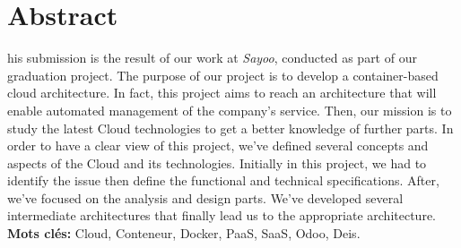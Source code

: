 
\chapter*{Abstract}
\begin{singlespace}
his submission is the result of our work at \emph{Sayoo}, conducted as part of our graduation project. The purpose of our project is to develop a container-based cloud architecture. 
\newline
\newline
In fact, this project aims to reach an architecture that will enable automated management of the company's service. Then, our mission is to study the latest Cloud technologies to get a better knowledge of further parts.
\noindent In order to have a clear view of this project, we've defined several concepts and aspects of the Cloud and its technologies.
\newline
\newline
Initially in this project, we had to identify the issue then define the functional and technical specifications. After, we've focused on the analysis and design parts. We've developed several intermediate architectures that finally lead us to the appropriate architecture.
\vfill{\textbf{Mots clés:} Cloud, Conteneur, Docker, PaaS, SaaS, Odoo, Deis.}
\end{singlespace}